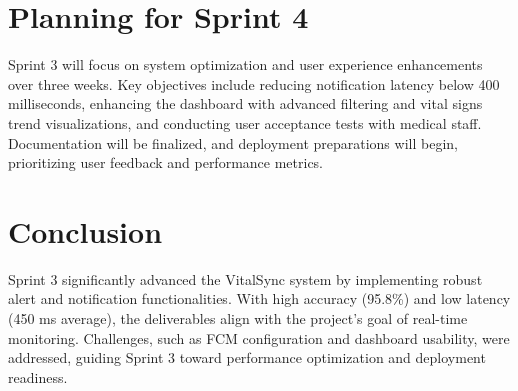 \section{Planning for Sprint 4
}
Sprint 3 will focus on system optimization and user experience enhancements over three weeks. Key objectives include reducing notification latency below 400 milliseconds, enhancing the dashboard with advanced filtering and vital signs trend visualizations, and conducting user acceptance tests with medical staff. Documentation will be finalized, and deployment preparations will begin, prioritizing user feedback and performance metrics.

\section*{Conclusion}
Sprint 3 significantly advanced the VitalSync system by implementing robust alert and notification functionalities. With high accuracy (95.8\%) and low latency (450 ms average), the deliverables align with the project’s goal of real-time monitoring. Challenges, such as FCM configuration and dashboard usability, were addressed, guiding Sprint 3 toward performance optimization and deployment readiness.
